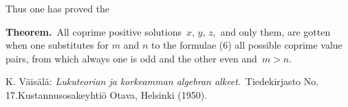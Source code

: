 \documentclass[12pt]{article}
\theoremstyle{definition}
\begin{document}
Thus one has proved the

\textbf{Theorem.}\, All coprime positive solutions\, $x,\,y,\,z$,\, and only them, are gotten when one substitutes for $m$ and $n$ to the formulae (6) all possible coprime value pairs, from which always one is odd and the other even and\, $m > n$.

\begin{thebibliography}{9}
 {\sc K. V\"ais\"al\"a}: {\em Lukuteorian ja korkeamman algebran alkeet}.\, Tiedekirjasto No. 17.\quad  Kustannusosakeyhti\"o Otava, Helsinki (1950).
\end{thebibliography}




\end{document}
